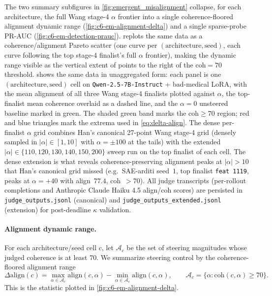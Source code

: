 The two summary subfigures in \cref{fig:emergent_misalignment} collapse, for each architecture, the full Wang stage-4 $\alpha$ frontier into a single coherence-floored alignment dynamic range (\cref{fig:c6-em-alignment-delta}) and a single sparse-probe PR-AUC (\cref{fig:c6-em-detection-prauc}).  replots the same data as a coherence/alignment Pareto scatter (one curve per $(\text{architecture}, \text{seed})$, each curve following the top stage-4 finalist's full $\alpha$ frontier), making the dynamic range visible as the vertical extent of points to the right of the $\text{coh} = 70$ threshold.  shows the same data in unaggregated form: each panel is one $(\text{architecture}, \text{seed})$ cell on \texttt{Qwen-2.5-7B-Instruct} + bad-medical LoRA, with the mean alignment of all three Wang stage-4 finalists plotted against $\alpha$, the top-finalist mean coherence overlaid as a dashed line, and the $\alpha\!=\!0$ unsteered baseline marked in green. The shaded green band marks the $\mathrm{coh}\geq70$ region; red and blue triangles mark the extrema used in \cref{eq:delta-align}. The dense per-finalist $\alpha$ grid combines Han's canonical 27-point Wang stage-4 grid (densely sampled in $|\alpha| \in [1, 10]$ with $\alpha = \pm 100$ at the tails) with the extended $|\alpha| \in \{110, 120, 130, 140, 150, 200\}$ sweep run on the top finalist of each cell. The dense extension is what reveals coherence-preserving alignment peaks at $|\alpha| > 10$ that Han's canonical grid missed (e.g.\ SAE-arditi seed~$1$, top finalist \texttt{feat 1119}, peaks at $\alpha = +40$ with align~$77.4$, coh~$> 70$). All judge transcripts (per-rollout completions and Anthropic Claude Haiku 4.5 align/coh scores) are persisted in \texttt{judge\_outputs.jsonl} (canonical) and \texttt{judge\_outputs\_extended.jsonl} (extension) for post-deadline $\kappa$ validation.

\paragraph{Alignment dynamic range.}
For each architecture/seed cell $c$, let $\mathcal A_c$ be the set of steering
magnitudes whose judged coherence is at least $70$. We summarize steering
control by the coherence-floored alignment range
\begin{equation}
    \Delta\mathrm{align}(c)
    =
    \max_{\alpha\in\mathcal A_c}\mathrm{align}(c,\alpha)
    -
    \min_{\alpha\in\mathcal A_c}\mathrm{align}(c,\alpha),
    \qquad
    \mathcal A_c=\{\alpha:\mathrm{coh}(c,\alpha)\ge 70\}.
    \label{eq:delta-align}
\end{equation}
This is the statistic plotted in \cref{fig:c6-em-alignment-delta}.

